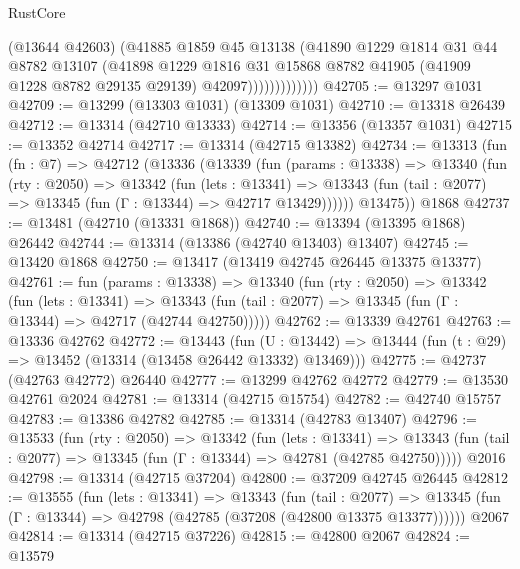 \begin{lexlean}{RustCore}
\begin{coremodule}
                        (@13644 @42603)
                        (@41885
                          @1859
                          @45
                          @13138
                          (@41890
                            @1229
                            @1814
                            @31
                            @44
                            @8782
                            @13107
                            (@41898
                              @1229
                              @1816
                              @31
                              @15868
                              @8782
                              @41905
                              (@41909 @1228 @8782 @29135 @29139)
                              @42097)))))))))))))
@42705 := @13297 @1031
@42709 := @13299 (@13303 @1031) (@13309 @1031)
@42710 := @13318 @26439
@42712 := @13314 (@42710 @13333)
@42714 := @13356 (@13357 @1031)
@42715 := @13352 @42714
@42717 := @13314 (@42715 @13382)
@42734 := @13313
    (fun (fn : @7) =>
    @42712
      (@13336
        (@13339
          (fun (params : @13338) =>
          @13340
            (fun (rty : @2050) =>
            @13342
              (fun (lets : @13341) =>
              @13343 (fun (tail : @2077) => @13345 (fun (Γ : @13344) => @42717 @13429))))))
        @13475))
    @1868
@42737 := @13481 (@42710 (@13331 @1868))
@42740 := @13394 (@13395 @1868) @26442
@42744 := @13314 (@13386 (@42740 @13403) @13407)
@42745 := @13420 @1868
@42750 := @13417 (@13419 @42745 @26445 @13375 @13377)
@42761 := fun (params : @13338) =>
  @13340
    (fun (rty : @2050) =>
    @13342
      (fun (lets : @13341) =>
      @13343 (fun (tail : @2077) => @13345 (fun (Γ : @13344) => @42717 (@42744 @42750)))))
@42762 := @13339 @42761
@42763 := @13336 @42762
@42772 := @13443
    (fun (U : @13442) => @13444 (fun (t : @29) => @13452 (@13314 (@13458 @26442 @13332) @13469)))
@42775 := @42737 (@42763 @42772) @26440
@42777 := @13299 @42762 @42772
@42779 := @13530 @42761 @2024
@42781 := @13314 (@42715 @15754)
@42782 := @42740 @15757
@42783 := @13386 @42782
@42785 := @13314 (@42783 @13407)
@42796 := @13533
    (fun (rty : @2050) =>
    @13342
      (fun (lets : @13341) =>
      @13343 (fun (tail : @2077) => @13345 (fun (Γ : @13344) => @42781 (@42785 @42750)))))
    @2016
@42798 := @13314 (@42715 @37204)
@42800 := @37209 @42745 @26445
@42812 := @13555
    (fun (lets : @13341) =>
    @13343
      (fun (tail : @2077) =>
      @13345 (fun (Γ : @13344) => @42798 (@42785 (@37208 (@42800 @13375 @13377))))))
    @2067
@42814 := @13314 (@42715 @37226)
@42815 := @42800 @2067
@42824 := @13579

\end{coremodule}
\end{lexlean}
